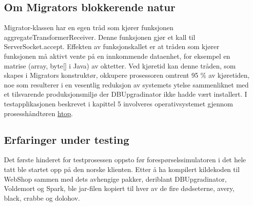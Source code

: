 \subsection{Om Migrators blokkerende natur}

Migrator-klassen har en egen tråd som kjører funksjonen aggregateTransformerReceiver. Denne funksjonen gjør et kall til ServerSocket.accept. Effekten av funksjonskallet er at tråden som kjører funksjonen må aktivt vente på en innkommende dataenhet, for eksempel en matrise (array, byte[] i Java) av oktetter. Ved kjøretid kan denne tråden, som skapes i Migrators konstruktør, okkupere prosessoren omtrent 95 \% av kjøretiden, noe som resulterer i en vesentlig reduksjon av systemets ytelse sammenliknet med et tilsvarende produksjonsmiljø der DBUpgradinator ikke hadde vært installert. I testapplikasjonen beskrevet i kapittel 5 involveres operativsystemet gjennom prosesshåndtøren \underline{htop}.


\subsection{Erfaringer under testing}

Det første hinderet for testprosessen oppsto før forespørselssimulatoren i det hele tatt ble startet opp på den norske klienten. Etter å ha kompilert kildekoden til WebShop sammen med dets avhengige pakker, deriblant DBUpgradinator, Voldemort og Spark, ble jar-filen kopiert til hver av de fire dødseterne, avery, black, crabbe og dolohov.

